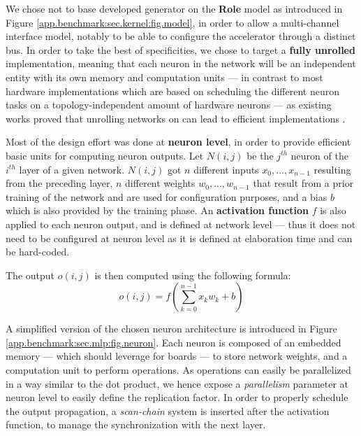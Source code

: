         We chose not to base developed generator on the {\bf Role} model as introduced in Figure \ref{app.benchmark:sec.kernel:fig.model}, in order to allow a multi-channel interface model, notably to be able to configure the accelerator through a distinct  bus.
        In order to take the best of  specificities, we chose to target a {\bf fully unrolled} implementation, meaning that each neuron in the network will be an independent entity with its own memory and computation units --- in contrast to most hardware implementations which are based on scheduling the different neuron tasks on a topology-independent amount of hardware neurons --- as existing works proved that unrolling networks on  can lead to efficient implementations \cite{prost2017scalable}.

        Most of the design effort was done at {\bf neuron level}, in order to provide efficient basic units for computing neuron outputs.
        Let $N(i, j)$ be the $j^{th}$ neuron of the $i^{th}$ layer of a given network.
        $N(i, j)$ got $n$ different inputs $x_0, ..., x_{n-1}$ resulting from the preceding layer, $n$ different weights $w_0, ..., w_{n-1}$ that result from a prior training of the network and are used for configuration purposes, and a bias $b$ which is also provided by the training phase. 
        An {\bf activation function} $f$ is also applied to each neuron output, and is defined at network level --- thus it does not need to be configured at neuron level as it is defined at elaboration time and can be hard-coded.

        The output $o(i, j)$ is then computed using the following formula:
        \begin{equation}
            \label{app.benchmark:sec.mlp:eq.formula}
            o(i, j) = f(\sum_{k = 0}^{n-1} x_k w_k + b)
        \end{equation}

        A simplified version of the chosen neuron architecture is introduced in Figure \ref{app.benchmark:sec.mlp:fig.neuron}.
        Each neuron is composed of an embedded memory --- which should leverage  for \Xilinx{} boards --- to store network weights, and a computation unit to perform  operations.
        As  operations can easily be parallelized in a way similar to the dot product, we hence expose a {\it parallelism} parameter at neuron level to easily define the  replication factor.
        In order to properly schedule the output propagation, a {\it scan-chain} system is inserted after the activation function, to manage the synchronization with the next layer.

